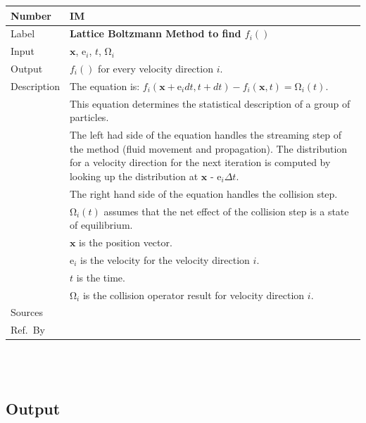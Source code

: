 \documentclass[12pt]{article}
\newcommand{\colAwidth}{0.13\textwidth}
\newcommand{\colBwidth}{0.82\textwidth}
\newcounter{instnum} %
\begin{document}
\noindent
\begin{minipage}{\textwidth}
	\renewcommand*{\arraystretch}{1.5}
	\begin{tabular}{| p{\colAwidth} | p{\colBwidth}|}
		\hline
		\rowcolor[gray]{0.9}
		Number& IM{instnum}\theinstnum \label{lbmim1}\\
		\hline
		Label& \bf Lattice Boltzmann Method to find $f_i()$\\
		\hline		
		Input&$\mathrm{\textbf{x}}$, $\mathrm{e}_i$, $t$, $\mathrm{\Omega}_i$\\
		\hline
		Output& $f_i()$ for every velocity direction $i$.\\
		\hline
		Description&
		The equation is: $f_i(\mathrm{\textbf{x}} +\mathrm{e}_i dt, t + dt) - f_i(\mathrm{\textbf{x}},t) = \mathrm{\Omega}_i (t)$.\\
		&This equation determines the statistical description of a group of particles.\\
		&The left had side of the equation handles the streaming step of the method (fluid movement and propagation). The distribution for a velocity direction for the next iteration is computed by looking up the distribution at $\mathrm{\textbf{x}}$ - $\mathrm{e}_i \Delta t$.\\
		&The right hand side of the equation handles the collision step.\\ &$\mathrm{\Omega}_i (t)$ assumes that the net effect of the collision step is a state of equilibrium.\\
		&$\mathrm{\textbf{x}}$ is the position vector.\\ 
		&$\mathrm{e}_i$ is the velocity for the velocity direction $i$.\\ 
		&$t$ is the time.\\ 
		&$\mathrm{\Omega}_i$ is the collision operator result for velocity direction $i$.\\
		\hline
		Sources& \citet{gibiansky} \\
		\hline
		Ref.\ By & \\
		\hline
	\end{tabular}
\end{minipage}\\


~\newpage

\subsection{Output} \label{sec_Output} 
\end{document}

